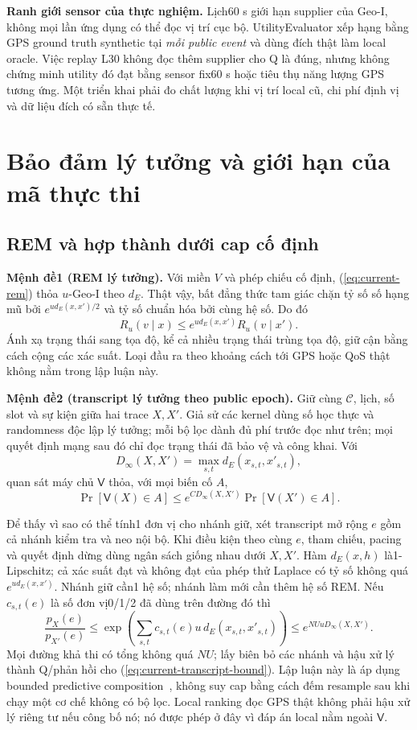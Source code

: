 \textbf{Ranh giới sensor của thực nghiệm.} Lịch60 s giới hạn supplier của Geo-I, không mọi lần ứng dụng có thể đọc vị trí cục bộ. UtilityEvaluator xếp hạng bằng GPS ground truth synthetic tại \emph{mỗi public event} và dùng đích thật làm local oracle. Việc replay L30 không đọc thêm supplier cho Q là đúng, nhưng không chứng minh utility đó đạt bằng sensor fix60 s hoặc tiêu thụ năng lượng GPS tương ứng. Một triển khai phải đo chất lượng khi vị trí local cũ, chi phí định vị và dữ liệu đích có sẵn thực tế.

\section{Bảo đảm lý tưởng và giới hạn của mã thực thi}
\label{sec:current-ideal-claim}

\subsection{REM và hợp thành dưới cap cố định}

\noindent\textbf{Mệnh đề1 (REM lý tưởng).} Với miền $V$ và phép chiếu cố định, (\ref{eq:current-rem}) thỏa $u$-Geo-I theo $d_E$. Thật vậy, bất đẳng thức tam giác chặn tỷ số số hạng mũ bởi $e^{u d_E(x,x')/2}$ và tỷ số chuẩn hóa bởi cùng hệ số. Do đó
\[
 R_u(v\mid x)\leq e^{u d_E(x,x')}R_u(v\mid x').
\]
Ánh xạ trạng thái sang tọa độ, kể cả nhiều trạng thái trùng tọa độ, giữ cận bằng cách cộng các xác suất. Loại đầu ra theo khoảng cách tới GPS hoặc QoS thật không nằm trong lập luận này.

\noindent\textbf{Mệnh đề2 (transcript lý tưởng theo public epoch).} Giữ cùng $\mathcal C$, lịch, số slot và sự kiện giữa hai trace $X,X'$. Giả sử các kernel dùng số học thực và randomness độc lập lý tưởng; mỗi bộ lọc dành đủ phí trước đọc như trên; mọi quyết định mạng sau đó chỉ đọc trạng thái đã bảo vệ và công khai. Với
\[
 D_\infty(X,X')=\max_{s,t}d_E(x_{s,t},x'_{s,t}),
\]
quan sát máy chủ $\mathsf V$ thỏa, với mọi biến cố $A$,
\begin{equation}
 \Pr[\mathsf V(X)\in A]\leq
 e^{C D_\infty(X,X')}\Pr[\mathsf V(X')\in A].
 \label{eq:current-transcript-bound}
\end{equation}

Để thấy vì sao có thể tính1 đơn vị cho nhánh giữ, xét transcript mở rộng $e$ gồm cả nhánh kiểm tra và neo nội bộ. Khi điều kiện theo cùng $e$, tham chiếu, pacing và quyết định dừng dùng ngân sách giống nhau dưới $X,X'$. Hàm $d_E(x,h)$ là1-Lipschitz; cả xác suất đạt và không đạt của phép thử Laplace có tỷ số không quá $e^{u d_E(x,x')}$. Nhánh giữ cần1 hệ số; nhánh làm mới cần thêm hệ số REM. Nếu $c_{s,t}(e)$ là số đơn vị0/1/2 đã dùng trên đường đó thì
\[
 \frac{p_X(e)}{p_{X'}(e)}
 \leq\exp\!\left(\sum_{s,t}c_{s,t}(e)u\,d_E(x_{s,t},x'_{s,t})\right)
 \leq e^{N Uu D_\infty(X,X')}.
\]
Mọi đường khả thi có tổng không quá $NU$; lấy biên bỏ các nhánh và hậu xử lý thành Q/phản hồi cho (\ref{eq:current-transcript-bound}). Lập luận này là áp dụng bounded predictive composition~\cite{chatzikokolakis2014predictive}, không suy cap bằng cách đếm resample sau khi chạy một cơ chế không có bộ lọc. Local ranking đọc GPS thật không phải hậu xử lý riêng tư nếu công bố nó; nó được phép ở đây vì đáp án local nằm ngoài $\mathsf V$.

